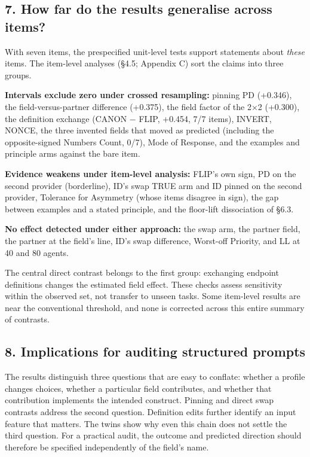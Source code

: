 \documentclass[
  11pt]{article}
\begin{document}
\subsection{7. How far do the results generalise across
items?}\label{how-far-do-the-results-generalise-across-items}

With seven items, the prespecified unit-level tests support statements
about \emph{these} items. The item-level analyses (§4.5; Appendix C)
sort the claims into three groups.

\textbf{Intervals exclude zero under crossed resampling:} pinning PD
(+0.346), the field-versus-partner difference (+0.375), the field factor
of the 2×2 (+0.300), the definition exchange (CANON − FLIP, +0.454, 7/7
items), INVERT, NONCE, the three invented fields that moved as predicted
(including the opposite-signed Numbers Count, 0/7), Mode of Response,
and the examples and principle arms against the bare item.

\textbf{Evidence weakens under item-level analysis:} FLIP's own sign, PD
on the second provider (borderline), ID's swap TRUE arm and ID pinned on
the second provider, Tolerance for Asymmetry (whose items disagree in
sign), the gap between examples and a stated principle, and the
floor-lift dissociation of §6.3.

\textbf{No effect detected under either approach:} the swap arm, the
partner field, the partner at the field's line, ID's swap difference,
Worst-off Priority, and LL at 40 and 80 agents.

The central direct contrast belongs to the first group: exchanging
endpoint definitions changes the estimated field effect. These checks
assess sensitivity within the observed set, not transfer to unseen
tasks. Some item-level results are near the conventional threshold, and
none is corrected across this entire summary of contrasts.

\subsection{8. Implications for auditing structured
prompts}\label{implications-for-auditing-structured-prompts}

The results distinguish three questions that are easy to conflate:
whether a profile changes choices, whether a particular field
contributes, and whether that contribution implements the intended
construct. Pinning and direct swap contrasts address the second
question. Definition edits further identify an input feature that
matters. The twins show why even this chain does not settle the third
question. For a practical audit, the outcome and predicted direction
should therefore be specified independently of the field's name.
\end{document}
